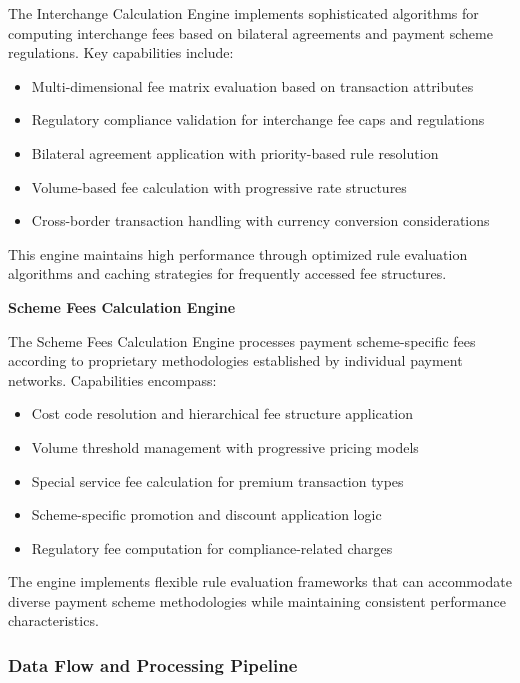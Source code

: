 The Interchange Calculation Engine implements sophisticated algorithms for computing interchange fees based on bilateral agreements and payment scheme regulations. Key capabilities include:

\begin{itemize}
    \item Multi-dimensional fee matrix evaluation based on transaction attributes
    \item Regulatory compliance validation for interchange fee caps and regulations
    \item Bilateral agreement application with priority-based rule resolution
    \item Volume-based fee calculation with progressive rate structures
    \item Cross-border transaction handling with currency conversion considerations
\end{itemize}

This engine maintains high performance through optimized rule evaluation algorithms and caching strategies for frequently accessed fee structures.

\textbf{Scheme Fees Calculation Engine}

The Scheme Fees Calculation Engine processes payment scheme-specific fees according to proprietary methodologies established by individual payment networks. Capabilities encompass:

\begin{itemize}
    \item Cost code resolution and hierarchical fee structure application
    \item Volume threshold management with progressive pricing models
    \item Special service fee calculation for premium transaction types
    \item Scheme-specific promotion and discount application logic
    \item Regulatory fee computation for compliance-related charges
\end{itemize}

The engine implements flexible rule evaluation frameworks that can accommodate diverse payment scheme methodologies while maintaining consistent performance characteristics.

\subsubsection{Data Flow and Processing Pipeline}

